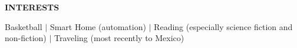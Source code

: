\begin{center}
\textbf{INTERESTS}
\end{center}

\vspace{0.3cm}

\begin{center}
Basketball $|$ Smart Home (automation) $|$ Reading (especially science fiction and non-fiction) $|$ Traveling (most recently to Mexico)
\end{center} 